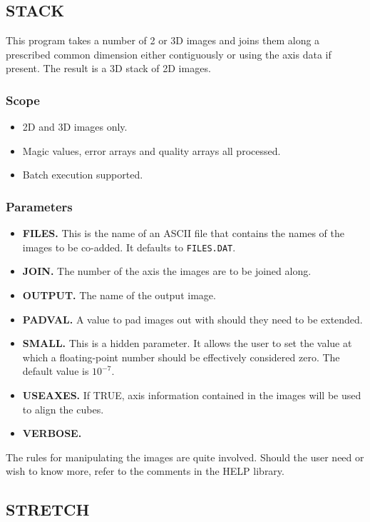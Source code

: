 \subsection{STACK}

This program takes a number of 2 or 3D images and joins them along a prescribed
common dimension either contiguously or using the axis data if present. The
result is a 3D stack of 2D images.

\subsubsection{Scope}

\begin{itemize}
\item 2D and 3D images only.
\item Magic values, error arrays and quality arrays all processed.
\item Batch execution supported.
\end{itemize}

\subsubsection{Parameters}

\begin{itemize}
\item {\bf FILES.} This is the name of an ASCII file that contains the names of
the images to be co-added. It defaults to {\tt FILES.DAT}.
\item {\bf JOIN.} The number of the axis the images are to be joined along.
\item {\bf OUTPUT.} The name of the output image.
\item {\bf PADVAL.} A value to pad images out with should they need to be 
extended.
\item {\bf SMALL.} This is a hidden parameter. It allows the user to set the
value at which a floating-point number should be effectively considered zero.
The default value is $10^{-7}$.
\item {\bf USEAXES.} If TRUE, axis information contained in the images will be
used to align the cubes.
\item {\bf VERBOSE.}
\end{itemize}

The rules for manipulating the images are quite involved. Should the user need
or wish to know more, refer to the comments in the HELP library. 

\subsection{STRETCH}

